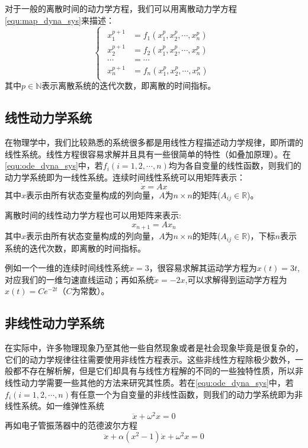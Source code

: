 对于一般的离散时间的动力学方程，我们可以用离散动力学方程\eqref{equ:map_dyna_sys}来描述：
\begin{equation}
    \begin{cases}
        \begin{aligned}
            x_1^{p+1} &= f_1(x_1^p,x_2^p,\cdots,x_n^p)\\
            x_2^{p+1} &= f_2(x_1^p,x_2^p,\cdots,x_n^p)\\
            \cdots &= \cdots \\
            x_n^{p+1} &= f_n(x_1^p,x_2^p,\cdots,x_n^p)
        \end{aligned}
    \end{cases}\label{equ:map_dyna_sys}
\end{equation}
其中$p\in \mathbb{N}$表示离散系统的迭代次数，即离散的时间指标。

\subsection{线性动力学系统}
在物理学中，我们比较熟悉的系统很多都是用线性方程描述动力学规律，即所谓的线性系统。线性方程很容易求解并且具有一些很简单的特性（如叠加原理）。在\eqref{equ:ode_dyna_sys}中，若$f_i(i=1,2,\cdots,n)$均为各自变量的线性函数，则我们的动力学系统即为一线性系统。连续时间线性系统可以用矩阵表示：
\begin{equation}
    \dot{x}=Ax
\end{equation}
其中$x$表示由所有状态变量构成的列向量，$A$为$n\times n$的矩阵($A_{ij}\in\mathbb{R}$)。

离散时间的线性动力学方程也可以用矩阵来表示:
\begin{equation}
    x_{n+1}=Ax_n
\end{equation}
其中$x$表示由所有状态变量构成的列向量，$A$为$n\times n$的矩阵($A_{ij}\in\mathbb{R}$)，下标$n$表示系统的迭代次数，即离散的时间指标。

例如一个一维的连续时间线性系统$\dot{x}=3$，很容易求解其运动学方程为$x(t)=3t$,对应我们的一维匀速直线运动；再如系统$\dot{x}=-2x$,可以求解得到运动学方程为$x(t)=Ce^{-2t}$（$C$为常数）。

\subsection{非线性动力学系统}
在实际中，许多物理现象乃至其他一些自然现象或者是社会现象毕竟是很复杂的，它们的动力学规律往往需要使用非线性方程表示。这些非线性方程除极少数外，一般都不存在解析解，但是它们却具有与线性方程解的不同的一些独特性质，所以非线性动力学需要一些其他的方法来研究其性质。若在\eqref{equ:ode_dyna_sys}中，若$f_i(i=1,2,\cdots,n)$有任意一个为自变量的非线性函数，则我们的动力学系统即为非线性系统。如一维弹性系统
\begin{equation}
    \ddot{x}+\omega^2x=0
\end{equation}
再如电子管振荡器中的范德波尔方程
\begin{equation}
    \ddot{x}+\alpha(x^2-1)\dot{x}+\omega^2x=0
\end{equation}

